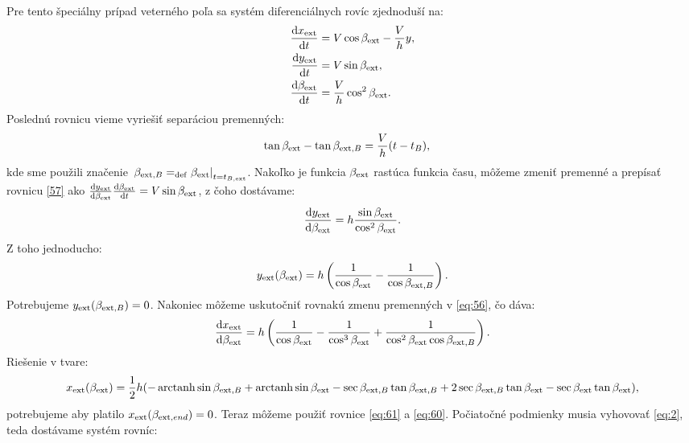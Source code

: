 \documentclass[reqno, a4paper]{amsart}
\numberwithin{equation}{section}
\begin{document}
Pre tento špeciálny prípad veterného poľa sa systém diferenciálnych rovíc zjednoduší na:
\begin{subequations}
 \label{eq:55}
 \begin{align}
  \label{eq:56}
  \frac{\mathrm{d} {x_{\mathrm{ext}}}}{\mathrm{d} {t}} &= V \cos \beta_{\mathrm{ext}} - \frac{V}{h}y,  \\
  \label{57}
  \frac{\mathrm{d} {y_{\mathrm{ext}}}}{\mathrm{d} {t}} &= V \sin \beta_{\mathrm{ext}},  \\
  \label{58}
  \frac{\mathrm{d} {\beta_{\mathrm{ext}}}}{\mathrm{d} {t}}
                              &=
  \frac{V}{h}  \cos^2 \beta_{\mathrm{ext}}.                         
 \end{align}

\end{subequations}
Poslednú rovnicu vieme vyriešiť separáciou premenných:
\begin{align}
 \label{eq:59}
\tan \beta_{\mathrm{ext}} - \tan \beta_{\mathrm{ext}, B} &= \frac{V}{h}(t-t_{B}),
\end{align}
kde sme použili značenie  $ \left. \beta_{\mathrm{ext}, B}=_{\mathrm{def}} \beta_{\mathrm{ext}} \right|_{t=t_{B, \mathrm{ext}}}   $.  Nakoľko je funkcia $\beta_{\mathrm{ext}}$ rastúca funkcia času, môžeme zmeniť premenné a prepísať rovnicu \ref{57} ako $\frac{\mathrm{d} {y_{\mathrm{ext}}}}{\mathrm{d} {\beta_{\mathrm{ext}}}}\frac{\mathrm{d} {\beta_{\mathrm{ext}}}}{\mathrm{d} {t}} = V \sin \beta_{\mathrm{ext}}$, z čoho dostávame:
\begin{align}
\frac{\mathrm{d} {y_{\mathrm{ext}}}}{\mathrm{d} {\beta_{\mathrm{ext}}}}=h\frac{\sin \beta_{\mathrm{ext}}}{\cos ^2 \beta_{\mathrm{ext}}}.
\end{align}
Z toho jednoducho:
\begin{align}
 \label{eq:60}
y_{\mathrm{ext}}(\beta_{\mathrm{ext}})=h\left(\frac{1}{\cos \beta_{\mathrm{ext}}}-\frac{1}{\cos \beta_{\mathrm{ext},B}}\right).
\end{align}
Potrebujeme $y_{\mathrm{ext}}(\beta_{\mathrm{ext},B})=0$. Nakoniec môžeme uskutočniť rovnakú zmenu premenných v \ref{eq:56}, čo dáva:
\begin{align}
\frac{\mathrm{d} {x_{\mathrm{ext}}}}{\mathrm{d} {\beta_{\mathrm{ext}}}}=h\left(\frac{1}{\cos \beta_{\mathrm{ext}}}-\frac{1}{\cos^3 \beta_{\mathrm{ext}}}+\frac{1}{\cos^2 \beta_{\mathrm{ext}} \cos \beta_{\mathrm{ext},B}}\right).
\end{align} 
Riešenie v tvare:
\begin{align}
 \label{eq:61}
x_{\mathrm{ext}}(\beta_{\mathrm{ext}})=\frac{1}{2}h(-\operatorname{arctanh} \sin \beta_{\mathrm{ext},B} + \operatorname{arctanh} \sin \beta_{\mathrm{ext}} - \sec \beta_{\mathrm{ext},B} \tan \beta_{\mathrm{ext},B} + 2\sec \beta_{\mathrm{ext},B} \tan \beta_{\mathrm{ext}} - \sec \beta_{\mathrm{ext}} \tan \beta_{\mathrm{ext}}),
\end{align}
potrebujeme aby platilo $x_{\mathrm{ext}}(\beta_{\mathrm{ext},end})=0$. Teraz môžeme použiť rovnice \ref{eq:61} a \ref{eq:60}. Počiatočné podmienky musia vyhovovať \ref{eq:2}, teda dostávame systém rovníc:
\end{document}
